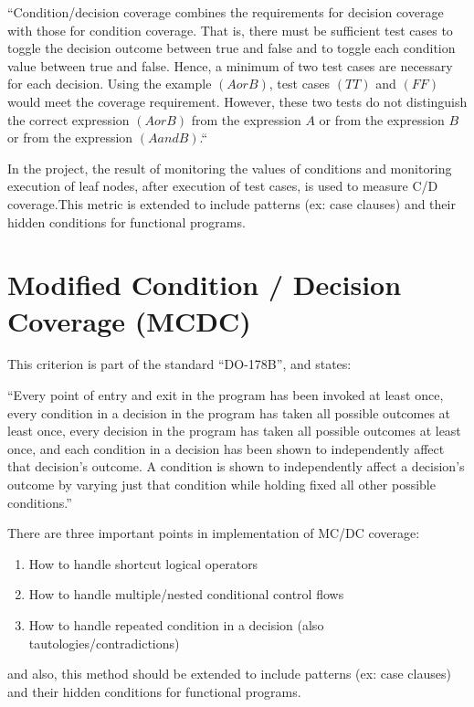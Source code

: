 \documentclass[12pt,a4paper]{report}
\begin{document}
“Condition/decision coverage combines the requirements for decision coverage with those for condition coverage. That is, there must be sufficient test cases
 to toggle the decision outcome between true and false and to toggle each condition value between true and false. Hence, a minimum of two test cases are
 necessary for each decision. Using the example $(A or B)$, test cases $(TT)$ and $(FF)$ would meet the coverage requirement. However, these two tests do
 not distinguish the correct expression $(A or B)$ from the expression $A$ or from the expression $B$ or from the expression $(A and B)$.“
\cite{KellyJ.:2001:PTM:886632} 

In the project, the result of monitoring the values of conditions and monitoring execution of leaf nodes, after execution of test cases, is used to
 measure C/D coverage.This metric is extended to include patterns (ex: case clauses) and their hidden conditions for functional programs.

\section{Modified Condition / Decision Coverage (MCDC)}
This criterion is part of the standard ``DO-178B'', and states:

“Every point of entry and exit in the program has been invoked at least once, every condition in a decision in the program has taken all possible outcomes
 at least once, every decision in the program has taken all possible outcomes at least once, and each condition in a decision has been shown to
 independently affect that decision's outcome. A condition is shown to independently affect a decision's outcome by varying just that condition while
 holding fixed all other possible conditions.”\cite{cast-10}

There are three important points in implementation of MC/DC coverage:

\begin{enumerate}
 \item How to handle shortcut logical operators
 \item How to handle multiple/nested conditional control flows
 \item How to handle repeated condition in a decision (also tautologies/contradictions)
\end{enumerate}
 
and also, this method should be extended to include patterns (ex: case clauses) and their hidden conditions for functional programs.
\end{document}
